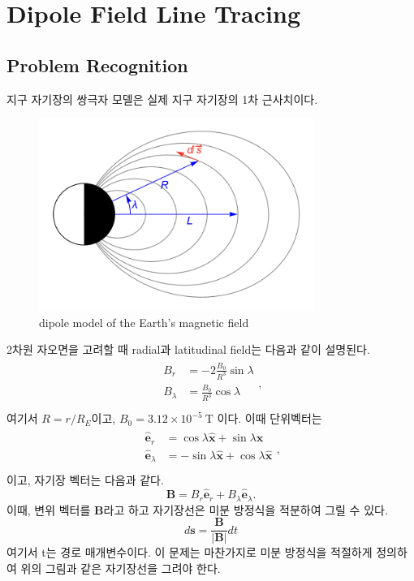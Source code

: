 \documentclass[11pt]{article}
\begin{document}
\section{Dipole Field Line Tracing}
\subsection{Problem Recognition} 
지구 자기장의 쌍극자 모델은 실제 지구 자기장의 1차 근사치이다. 
\begin{figure}[!ht]
  \centering
  \includegraphics[width=0.8\textwidth]{ElectricField.png}
  \caption{dipole model of the Earth’s magnetic field}
\end{figure} 
2차원 자오면을 고려할 때 radial과 latitudinal field는 다음과 같이 설명된다.
\begin{equation}
\begin{split}
\begin{aligned}
B_r &= -2 \frac{B_0}{R^3} \sin\lambda \\
B_\lambda &= \frac{B_0}{R^3} \cos\lambda \\
\end{aligned}
,
\end{split}
\end{equation}
여기서 $R = r / R_E$이고, $B_0 = 3.12 \times 10^{-5}\ \mathrm{T}$ 이다. 이때 단위벡터는 
\begin{equation}
\begin{split}
\begin{aligned}
\hat{\mathbf e}_r &= \cos\lambda \hat{\mathbf x} + \sin\lambda \hat{\mathbf x} \\
\hat{\mathbf e}_\lambda &= -\sin\lambda \hat{\mathbf x} + \cos\lambda \hat{\mathbf x} \\
\end{aligned}
,
\end{split}
\end{equation}
이고, 자기장 벡터는 다음과 같다.
\begin{equation}
\mathbf B = B_r \hat{\mathbf e}_r + B_\lambda \hat{\mathbf e}_\lambda
.
\end{equation}
이때, 변위 벡터를 $\mathbf B$라고 하고 자기장선은 미분 방정식을 적분하여 그릴 수 있다.
\begin{equation}
d\mathbf s = \frac{\mathbf B}{|\mathbf B|} dt
\end{equation}
여기서 t는 경로 매개변수이다. 이 문제는 마찬가지로 미분 방정식을 적절하게 정의하여 위의 그림과 같은 자기장선을 그려야 한다.
\end{document}
